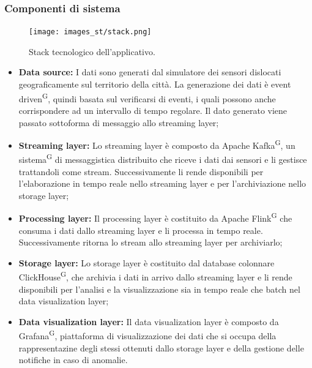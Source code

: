 \documentclass[8pt]{article}
\newcommand{\glossterm}[1]{#1\textsuperscript{G}} %
\begin{document}
\subsubsection{Componenti di sistema}
\begin{figure}[h!]
    \centering
    \texttt{[image: images\_st/stack.png]}
    \caption{Stack tecnologico dell'applicativo.}
    \label{fig:Stack tecnologico dell'applicativo}
\end{figure}
\begin{itemize}
    \item \textbf{Data source:} I dati sono generati dal simulatore dei sensori dislocati geograficamente sul territorio della città. La generazione dei dati è \glossterm{event driven}, quindi basata sul verificarsi di eventi, i quali possono anche corrispondere ad un intervallo di tempo regolare. Il dato generato viene passato sottoforma di messaggio allo streaming layer; 
    \item \textbf{Streaming layer:} Lo streaming layer è composto da Apache \glossterm{Kafka}, un \glossterm{sistema} di messaggistica distribuito che riceve i dati dai sensori e li gestisce trattandoli come stream. Successivamente li rende disponibili per l’elaborazione in tempo reale nello streaming layer e per l'archiviazione nello storage layer; 
    \item \textbf{Processing layer:} Il processing layer è costituito da Apache \glossterm{Flink} che consuma i dati dallo streaming layer e li processa in tempo reale. Successivamente ritorna lo stream allo streaming layer per archiviarlo;
    \item \textbf{Storage layer:} Lo storage layer è costituito dal database colonnare \glossterm{ClickHouse}, che archivia i dati in arrivo dallo streaming layer e li rende disponibili per l’analisi e la visualizzazione sia in tempo reale che batch nel data visualization layer;
    \item \textbf{Data visualization layer:} Il data visualization layer è composto da \glossterm{Grafana}, piattaforma di visualizzazione dei dati che si occupa della rappresentazine degli stessi ottenuti dallo storage layer e della gestione delle notifiche in caso di anomalie.
\end{itemize}
\clearpage
\end{document}

